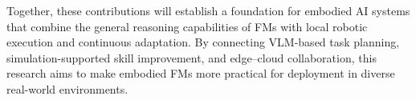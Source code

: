 \documentclass[11pt]{article}
\begin{document}
Together, these contributions will establish a foundation for embodied AI systems that combine the general reasoning capabilities of FMs with local robotic execution and continuous adaptation. By connecting VLM-based task planning, simulation-supported skill improvement, and edge--cloud collaboration, this research aims to make embodied FMs more practical for deployment in diverse real-world environments.



\end{document}
